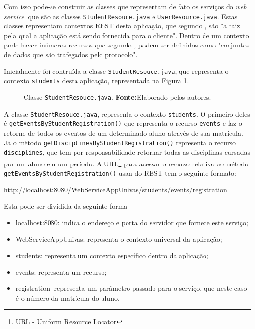 	\par Com isso pode-se construir as classes que representam de fato os serviços
do \textit{web service}, que são as classes \texttt{StudentResouce.java} e
\texttt{UserResource.java}. Estas classes representam contextos REST desta
aplicação, que segundo , são "a raiz pela qual a
aplicação está sendo fornecida para o cliente". Dentro de um contexto pode haver
inúmeros recursos que segundo , podem ser definidos
como "conjuntos de dados que são trafegados pelo protocolo".

	\par Inicialmente foi contruída a classe \texttt{StudentResouce.java}, que
representa o contexto \texttt{students} desta aplicação, representada na Figura
\ref{fig:desws25_1}.

	\begin{figure}[h!]
		
		\caption[Classe StudentResouce.java]{Classe \texttt{StudentResouce.java}.
		\textbf{Fonte:}Elaborado pelos autores.}
		\label{fig:desws25_1}
	\end{figure}
		
	\par A classe \texttt{StudentResouce.java}, representa o contexto
\texttt{students}. O primeiro deles é \texttt{getEventsByStudentRegistration()}
que representa o recurso \texttt{events} e faz o retorno de todos os eventos de
um determinado aluno através de sua matrícula. Já o método
\texttt{getDisciplinesByStudentRegistration()} representa o recurso
\texttt{disciplines}, que tem por responsabilidade retornar todas as
disciplinas cursadas por um aluno em um período. A URL\footnote{URL - Uniform
Resource Locator} para acessar o recurso relativo ao método
\texttt{getEventsByStudentRegistration()} usan-do REST tem o seguinte
formato:\\
		
		\begin{center}
			http://localhost:8080/WebServiceAppUnivas/students/events/{registration}		
		\end{center}
	
	\par Esta pode ser dividida da seguinte forma:

	\begin{itemize}
	  \item localhost:8080: indica o endereço e porta do servidor que fornece este
	  serviço;
	  \item WebServiceAppUnivas: representa o contexto universal da aplicação; 
	  \item students: representa um contexto específico dentro da aplicação;
	  \item events: representa um recurso;
	  \item registration: representa um parâmetro passado para o serviço, que
	  neste caso é o número da matrícula do aluno.
	\end{itemize}

